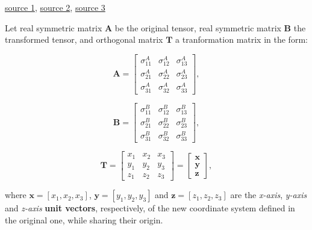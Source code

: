 \documentclass[10pt,b5paper,titlepage]{book}
\begin{document}
\href{https://wp.optics.arizona.edu/optomech/wp-content/uploads/sites/53/2016/10/OPTI_222_W21.pdf}{source 1},
\href{https://www.continuummechanics.org/principalstressesandstrains.html}{source 2},
\href{https://www.ecourses.ou.edu/cgi-bin/eBook.cgi?doc=&topic=me&chap_sec=07.2&page=theory}{source 3}

Let real symmetric matrix  $\mathbf{A}$ be the original tensor,
real symmetric matrix $\mathbf{B}$ the transformed tensor, and
orthogonal matrix $\mathbf{T}$ a tranformation matrix in the form:

\begin{equation}
    \mathbf{A} = \begin{bmatrix}
        \sigma^{A}_{11} & \sigma^{A}_{12} & \sigma^{A}_{13} \\
        \sigma^{A}_{21} & \sigma^{A}_{22} & \sigma^{A}_{23} \\
        \sigma^{A}_{31} & \sigma^{A}_{32} & \sigma^{A}_{33}
    \end{bmatrix}
,\end{equation}

\begin{equation}
    \mathbf{B} = \begin{bmatrix}
        \sigma^{B}_{11} & \sigma^{B}_{12} & \sigma^{B}_{13} \\
        \sigma^{B}_{21} & \sigma^{B}_{22} & \sigma^{B}_{23} \\
        \sigma^{B}_{31} & \sigma^{B}_{32} & \sigma^{B}_{33}
    \end{bmatrix}
,\end{equation}

\begin{equation}
    \mathbf{T} = \begin{bmatrix}
        x_1 & x_2 & x_3 \\
        y_1 & y_2 & y_3 \\
        z_1 & z_2 & z_3
    \end{bmatrix} = \begin{bmatrix}
        \mathbf{x} \\
        \mathbf{y} \\
        \mathbf{z}
    \end{bmatrix}
,\end{equation}

where $\mathbf{x} = [x_1, x_2, x_3]$, $\mathbf{y} = [y_1, y_2, y_3]$ and
$\mathbf{z} = [z_1, z_2, z_3]$ are the \textit{x-axis}, \textit{y-axis} and
\textit{z-axis} \textbf{unit vectors}, respectively, of the new coordinate
system defined in the original one, while sharing their origin.
\end{document}

